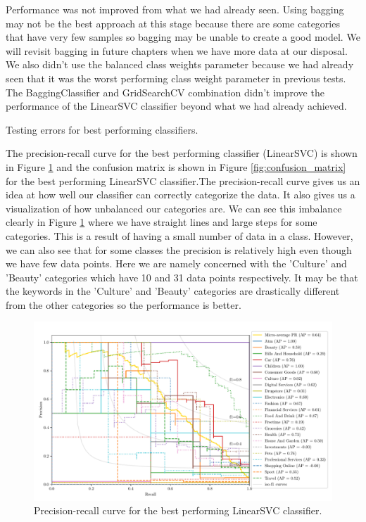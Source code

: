 Performance was not improved from what we had already seen. Using bagging may not be the best approach at this stage because there are some categories that have very few samples so bagging may be unable to create a good model. We will revisit bagging in future chapters when we have more data at our disposal. We also didn't use the balanced class weights parameter because we had already seen that it was the worst performing class weight parameter in previous tests. The BaggingClassifier and GridSearchCV combination didn't improve the performance of the LinearSVC classifier beyond what we had already achieved.

\begin{table}[h]
\centering
\caption{Testing errors for best performing classifiers.}

\label{tab:best_errors}
\end{table}

The precision-recall curve for the best performing classifier (LinearSVC) is shown in Figure \ref{fig:pr_curve} and the confusion matrix is shown in Figure \ref{fig:confusion_matrix} for the best performing LinearSVC classifier.The precision-recall curve gives us an idea at how well our classifier can correctly categorize the data. It also gives us a visualization of how unbalanced our categories are. We can see this imbalance clearly in Figure \ref{fig:pr_curve} where we have straight lines and large steps for some categories. This is a result of having a small number of data in a class. However, we can also see that for some classes the precision is relatively high even though we have few data points. Here we are namely concerned with the 'Culture' and 'Beauty' categories which have 10 and 31 data points respectively. It may be that the keywords in the 'Culture' and 'Beauty' categories are drastically different from the other categories so the performance is better. 

\begin{figure}[h]
  \centering
  \includegraphics[width=\scale\textwidth]{../img/plot_pr_curve.pdf}
  \caption{Precision-recall curve for the best performing LinearSVC classifier.}
  \label{fig:pr_curve}
\end{figure}

